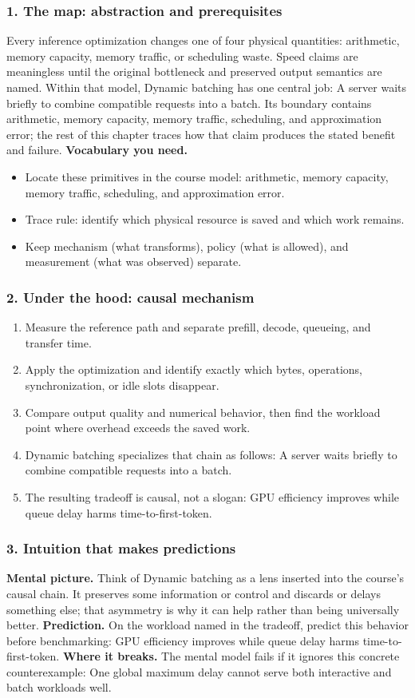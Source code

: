 \subsubsection*{1. The map: abstraction and prerequisites}
Every inference optimization changes one of four physical quantities: arithmetic, memory capacity, memory traffic, or scheduling waste. Speed claims are meaningless until the original bottleneck and preserved output semantics are named.
Within that model, Dynamic batching has one central job: A server waits briefly to combine compatible requests into a batch. Its boundary contains arithmetic, memory capacity, memory traffic, scheduling, and approximation error; the rest of this chapter traces how that claim produces the stated benefit and failure.
\textbf{Vocabulary you need.}\begin{itemize}
\item Locate these primitives in the course model: arithmetic, memory capacity, memory traffic, scheduling, and approximation error.
\item Trace rule: identify which physical resource is saved and which work remains.
\item Keep mechanism (what transforms), policy (what is allowed), and measurement (what was observed) separate.
\end{itemize}
\subsubsection*{2. Under the hood: causal mechanism}\begin{enumerate}
\item Measure the reference path and separate prefill, decode, queueing, and transfer time.
\item Apply the optimization and identify exactly which bytes, operations, synchronization, or idle slots disappear.
\item Compare output quality and numerical behavior, then find the workload point where overhead exceeds the saved work.
\item Dynamic batching specializes that chain as follows: A server waits briefly to combine compatible requests into a batch.
\item The resulting tradeoff is causal, not a slogan: GPU efficiency improves while queue delay harms time-to-first-token.
\end{enumerate}
\subsubsection*{3. Intuition that makes predictions}
\textbf{Mental picture.} Think of Dynamic batching as a lens inserted into the course's causal chain. It preserves some information or control and discards or delays something else; that asymmetry is why it can help rather than being universally better.
\textbf{Prediction.} On the workload named in the tradeoff, predict this behavior before benchmarking: GPU efficiency improves while queue delay harms time-to-first-token.
\textbf{Where it breaks.} The mental model fails if it ignores this concrete counterexample: One global maximum delay cannot serve both interactive and batch workloads well.
